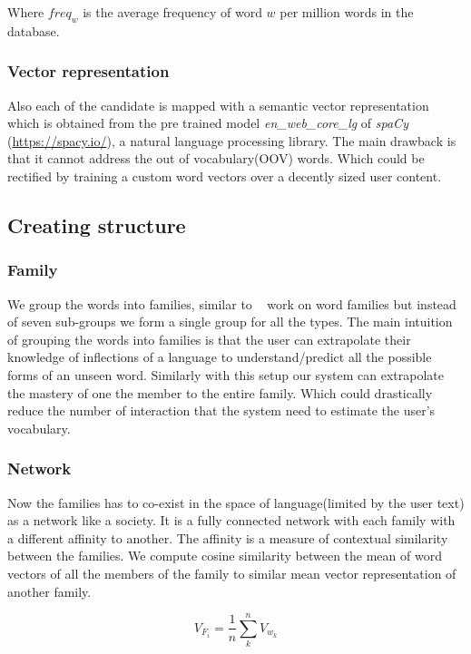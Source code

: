 \documentclass[11pt,a4paper]{article}
\begin{document}
Where ${freq_w}$ is the average frequency of word $w$ per million words in the
database.

\subsubsection{Vector representation}
Also each of the candidate is mapped with a semantic vector representation which
is obtained from the pre trained model \emph{en\_web\_core\_lg} of \emph{spaCy}
(\url{https://spacy.io/}), a natural language processing library. The main
drawback is that it cannot address the out of vocabulary(OOV) words. Which
could be rectified by training a custom word vectors over a decently sized user content.

\subsection{Creating structure}

\subsubsection{Family}
We group the words into families, similar to ~\citet{bauer1993word} work on word
families but instead of seven sub-groups we form a single group for all the types.
The main intuition of grouping the words into families is that the user can
extrapolate their knowledge of inflections of a language to understand/predict
all the possible forms of an unseen word. Similarly with this setup our system
can extrapolate the mastery of one the member to the entire family. Which could 
drastically reduce the number of interaction that the system need to estimate
the user's vocabulary.





\subsubsection{Network}
Now the families has to co-exist in the space of language(limited by the
user text) as a network like a society. It is a fully connected network with each
family with a different affinity to another. The affinity is a measure of
contextual similarity between the families. We compute cosine similarity 
between the mean of word vectors of all the members of the family to similar
mean vector representation of another family.

\begin{equation}
  V_{F_i} = \frac{1}{n} \sum_{k}^{n} V_{w_k}
\end{equation}
\end{document}
